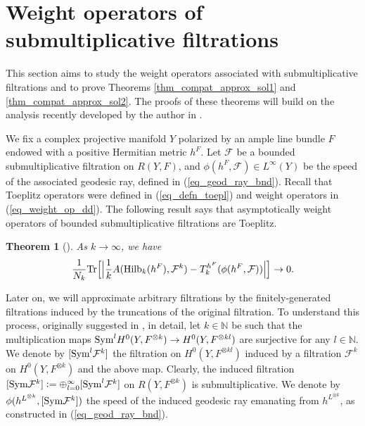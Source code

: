 \documentclass[12pt]{article}
\numberwithin{equation}{section}
\theoremstyle{theorem}
\newtheorem{thm}{Theorem}[section]
\theoremstyle{definition}
\theoremstyle{remark}
\newcommand{\nat}{\mathbb{N}}
\begin{document}
	\section{Weight operators of submultiplicative filtrations}\label{sect_weight_oper}
	This section aims to study the weight operators associated with submultiplicative filtrations and to prove Theorems \ref{thm_compat_approx_sol1} and \ref{thm_compat_approx_sol2}. 
	The proofs of these theorems will build on the analysis recently developed by the author in \cite{FinSubmToepl}.
	\par 
	We fix a complex projective manifold $Y$ polarized by an ample line bundle $F$ endowed with a positive Hermitian metric $h^F$.
	Let $\mathcal{F}$ be a bounded submultiplicative filtration on $R(Y, F)$, and $\phi(h^F, \mathcal{F}) \in L^{\infty}(Y)$ be the speed of the associated geodesic ray, defined in (\ref{eq_geod_ray_bnd}).
	Recall that Toeplitz operators were defined in (\ref{eq_defn_toepl}) and weight operators in (\ref{eq_weight_op_dd}).
	The following result says that asymptotically weight operators of bounded submultiplicative filtrations are Toeplitz.
	\begin{sloppypar}
	\begin{thm}[{\cite[Theorem 1.6]{FinSubmToepl}}]\label{thm_main2prev}
		As $k \to \infty$, we have
		\begin{equation}
			\frac{1}{N_k}
			{\rm{Tr}} 
			\Big[
			\Big|
				\frac{1}{k} A({\rm{Hilb}}_k(h^F), \mathcal{F}^k)
				-
				T^{h^F}_{k}(\phi(h^F, \mathcal{F}))
			\Big|
			\Big]
			\to
			0.
		\end{equation}
	\end{thm}
	\end{sloppypar}
	\par 
	Later on, we will approximate arbitrary filtrations by the finitely-generated filtrations induced by the truncations of the original filtration.
	To understand this process, originally suggested in \cite{SzekeTestConf}, in detail, let $k \in \nat$ be such that the multiplication maps ${\rm{Sym}}^l H^0(Y, F^{\otimes k}) \to H^0(Y, F^{\otimes k l})$ are surjective for any $l \in \nat$. 
	We denote by $[{\rm{Sym}}^l \mathcal{F}^k]$ the filtration on $H^0(Y, F^{\otimes k l})$ induced by a filtration $\mathcal{F}^k$ on $H^0(Y, F^{\otimes k})$ and the above map.
	Clearly, the induced filtration $[{\rm{Sym}} \mathcal{F}^k] := \oplus_{l = 0}^{\infty} [{\rm{Sym}}^l \mathcal{F}^k]$ on $R(Y, F^{\otimes k})$ is submultiplicative.
	We denote by $\phi(h^{L^{\otimes k}}, [{\rm{Sym}} \mathcal{F}^k])$ the speed of the induced geodesic ray emanating from $h^{L^{\otimes k}}$, as constructed in (\ref{eq_geod_ray_bnd}).
\end{document}
